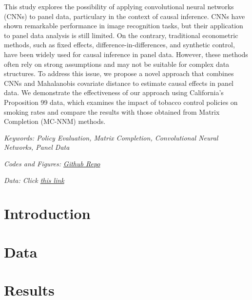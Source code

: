 \documentclass[12pt]{article}
\begin{document}
		\begin{singlespace} 
			This study explores the possibility of applying convolutional neural networks (CNNs) to panel data, particulary in the context of causal inference.
			CNNs have shown remarkable performance in image recognition tasks, but their application to panel data analysis is still limited.
			On the contrary, traditional econometric methods, such as fixed effects, difference-in-differences, and synthetic control, have been widely used for causal inference in panel data.
			However, these methods often rely on strong assumptions and may not be suitable for complex data structures.
			To address this issue, we propose a novel approach that combines CNNs and Mahalanobis covariate distance to estimate causal effects in panel data.
			We demonstrate the effectiveness of our approach using California's Proposition 99 data, which examines the impact of tobacco control policies on smoking rates and
			compare the results with those obtained from Matrix Completion (MC-NNM) methods.
		\end{singlespace}
		
		\bigskip
		\noindent \emph{Keywords: Policy Evaluation, Matrix Completion, Convolutional Neural Networks, Panel Data}
		\vspace{0.2cm}

		\noindent \emph{Codes and Figures: \href{https://github.com/wooyongp/deep-learning-final}{Github Repo}}
		\vspace{0.2cm}

		\noindent \emph{Data: Click \href{https://drive.google.com/uc?id=1wD8h8pjCLDy1RbuPDZBSa3zH45TZL7ha&export=download}{this link}}
		
		
		
		


\newpage

\fontsize{11pt}{11pt}\selectfont
\section{Introduction}



\section{Data}


\section{Results}

\end{document}
